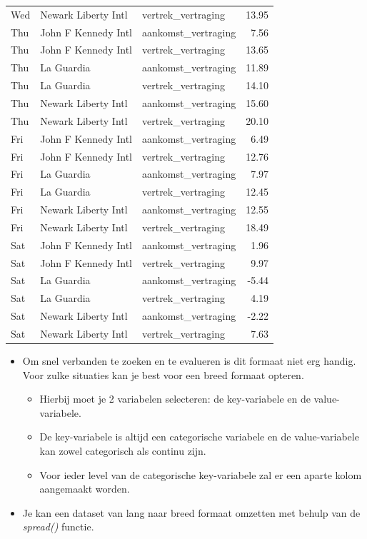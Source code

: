 \documentclass[]{tufte-book}
\providecommand{\tightlist}{%
  \setlength{\itemsep}{0pt}\setlength{\parskip}{0pt}}
\begin{document}
\begin{table}
\begin{tabular}[t]{lllr}
Wed & Newark Liberty Intl & vertrek\_vertraging & 13.95\\
Thu & John F Kennedy Intl & aankomst\_vertraging & 7.56\\
\addlinespace
Thu & John F Kennedy Intl & vertrek\_vertraging & 13.65\\
Thu & La Guardia & aankomst\_vertraging & 11.89\\
Thu & La Guardia & vertrek\_vertraging & 14.10\\
Thu & Newark Liberty Intl & aankomst\_vertraging & 15.60\\
Thu & Newark Liberty Intl & vertrek\_vertraging & 20.10\\
\addlinespace
Fri & John F Kennedy Intl & aankomst\_vertraging & 6.49\\
Fri & John F Kennedy Intl & vertrek\_vertraging & 12.76\\
Fri & La Guardia & aankomst\_vertraging & 7.97\\
Fri & La Guardia & vertrek\_vertraging & 12.45\\
Fri & Newark Liberty Intl & aankomst\_vertraging & 12.55\\
\addlinespace
Fri & Newark Liberty Intl & vertrek\_vertraging & 18.49\\
Sat & John F Kennedy Intl & aankomst\_vertraging & 1.96\\
Sat & John F Kennedy Intl & vertrek\_vertraging & 9.97\\
Sat & La Guardia & aankomst\_vertraging & -5.44\\
Sat & La Guardia & vertrek\_vertraging & 4.19\\
\addlinespace
Sat & Newark Liberty Intl & aankomst\_vertraging & -2.22\\
Sat & Newark Liberty Intl & vertrek\_vertraging & 7.63\\
\bottomrule
\end{tabular}
\end{table}

\begin{itemize}
\tightlist
\item
  Om snel verbanden te zoeken en te evalueren is dit formaat niet erg handig. Voor zulke situaties kan je best voor een breed formaat opteren.

  \begin{itemize}
  \tightlist
  \item
    Hierbij moet je 2 variabelen selecteren: de key-variabele en de value-variabele.
  \item
    De key-variabele is altijd een categorische variabele en de value-variabele kan zowel categorisch als continu zijn.
  \item
    Voor ieder level van de categorische key-variabele zal er een aparte kolom aangemaakt worden.
  \end{itemize}
\item
  Je kan een dataset van lang naar breed formaat omzetten met behulp van de \emph{spread()} functie.
\end{itemize}
\end{document}

